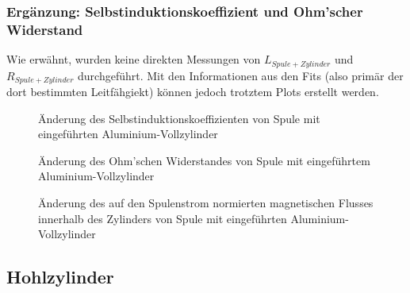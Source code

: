 \subsubsection{Erg\"anzung: Selbstinduktionskoeffizient und Ohm'scher Widerstand}
\label{sec:ausw:subsec:vollz:subsubsec:LR}

Wie erw\"ahnt, wurden keine direkten  Messungen von $L_{Spule + Zylinder}$ und
$R_{Spule  + Zylinder}$  durchgef\"uhrt. Mit  den Informationen  aus den  Fits
(also prim\"ar  der dort  bestimmten Leitf\"ahgiekt) k\"onnen  jedoch trotztem
Plots erstellt werden.


\begin{figure}[h!]
    \resizebox{\textwidth}{!}{}
    \caption{\"Anderung des Selbstinduktionskoeffizienten von Spule mit eingef\"uhrten Aluminium-Vollzylinder}
    \label{fig:alu:freq:L}
\end{figure}

\begin{figure}[h!]
    \resizebox{\textwidth}{!}{}
    \caption{\"Anderung des Ohm'schen Widerstandes von Spule mit eingef\"uhrtem Aluminium-Vollzylinder}
    \label{fig:alu:freq:R}
\end{figure}

\begin{figure}[h!]
    \resizebox{\textwidth}{!}{}
    \caption{\"Anderung des auf den Spulenstrom normierten magnetischen Flusses innerhalb des Zylinders von Spule mit eingef\"uhrten Aluminium-Vollzylinder}
    \label{fig:alu:freq:phi}
\end{figure}



\clearpage
\subsection{Hohlzylinder}
\label{sec:ausw:subsec:hohlz}


